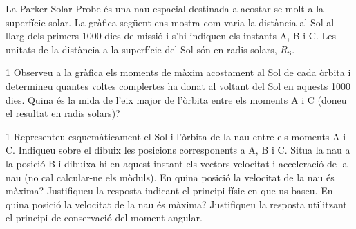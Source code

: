 La Parker Solar Probe és una nau espacial destinada a acostar-se molt a la superfície solar. La gràfica següent ens mostra com varia la distància al Sol al llarg dels primers 1000 dies de missió i s'hi indiquen els instants A, B i C. Les unitats de la distància a la superfície del Sol són en radis solars, $R_\mathrm{S}$.


\begin{apartat}{1}
Observeu a la gràfica els moments de màxim acostament al Sol de cada òrbita i determineu quantes voltes complertes ha donat al voltant del Sol en aquests 1000 dies. Quina és la mida de l'eix major de l'òrbita entre els moments A i C (doneu el resultat en radis solars)?
\end{apartat}

\begin{apartat}{1}
Representeu esquemàticament el Sol i l'òrbita de la nau entre els moments A i C. Indiqueu sobre el dibuix les posicions corresponents a A, B i C. Situa la nau a la posició B i dibuixa-hi en aquest instant els vectors velocitat i acceleració de la nau (no cal calcular-ne els mòduls). En quina posició la velocitat de la nau és màxima? Justifiqueu la resposta indicant el principi físic en que us baseu. En quina posició la velocitat de la nau és màxima? Justifiqueu la resposta utilitzant el principi de conservació del moment angular.
\end{apartat}
